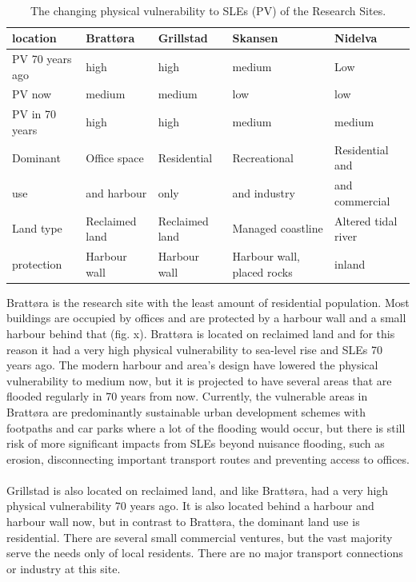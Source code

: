 \paragraph{}
\begin{table}[!ht]
    \centering
    \begin{tabular}{|l|l|l|l|l|}
    \hline
        \textbf{location} & \textbf{Brattøra} & \textbf{Grillstad} & \textbf{Skansen}  & \textbf{Nidelva} \\ \hline
        PV 70 years ago & high & high & medium & Low \\ \hline
        PV now &  medium &  medium &  low &  low \\ \hline
        PV in 70 years &  high &  high &  medium &  medium \\ \hline
        Dominant & Office space  & Residential & Recreational  & Residential and \\ \newline
        use & and harbour &  only   &  and industry & and commercial  \\ \hline
        Land type & Reclaimed land & Reclaimed land & Managed coastline  & Altered tidal river \\ \hline
        protection & Harbour wall & Harbour wall & Harbour wall, placed rocks & inland \\ \hline
    \end{tabular}
    \caption{The changing physical vulnerability to SLEs (PV) of the Research Sites.}
    \label{table:research_site}
\end{table}

Brattøra is the research site with the least amount of residential population. Most buildings are occupied by offices and are protected by a harbour wall and a small harbour behind that (fig. x). Brattøra is located on reclaimed land and for this reason it had a very high physical vulnerability to sea-level rise and SLEs 70 years ago. The modern harbour and area's design have lowered the physical vulnerability to medium now, but it is projected to have several areas that are flooded regularly in 70 years from now. Currently, the vulnerable areas in Brattøra are predominantly sustainable urban development schemes with footpaths and car parks where a lot of the flooding would occur, but there is still risk of more significant impacts from SLEs beyond nuisance flooding, such as erosion, disconnecting important transport routes and preventing access to offices.
\paragraph{}
Grillstad is also located on reclaimed land, and like Brattøra, had a very high physical vulnerability 70 years ago. It is also located behind a harbour and harbour wall now, but in contrast to  Brattøra, the dominant land use is residential. There are several small commercial ventures, but the vast majority serve the needs only of local residents. There are no major transport connections or industry at this site. 
